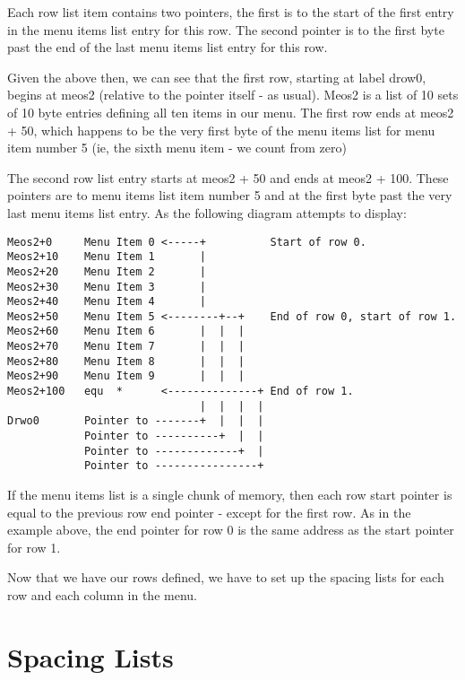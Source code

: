 Each row list item contains two pointers, the first is to the start
    of the first entry in the menu items list entry for this row. The second
    pointer is to the first byte past the end of the last menu items list
    entry for this row.

Given the above then, we can see that the first row, starting at
    label drow0, begins at meos2 (relative to the pointer itself -{} as usual).
    Meos2 is a list of 10 sets of 10 byte entries defining all ten items in
    our menu. The first row ends at meos2 + 50, which happens to be the very
    first byte of the menu items list for menu item number 5 (ie, the sixth
    menu item -{} we count from zero)

The second row list entry starts at meos2 + 50 and ends at meos2 +
    100. These pointers are to menu items list item number 5 and at the first
    byte past the very last menu items list entry. As the following diagram
    attempts to display:

\begin{lstlisting}[frame=none,numbers=none,caption={Relationship between the Row List \& Menu Items List} ]
Meos2+0     Menu Item 0 <-----+          Start of row 0.   
Meos2+10    Menu Item 1       |  
Meos2+20    Menu Item 2       |
Meos2+30    Menu Item 3       |
Meos2+40    Menu Item 4       |
Meos2+50    Menu Item 5 <--------+--+    End of row 0, start of row 1.
Meos2+60    Menu Item 6       |  |  |  
Meos2+70    Menu Item 7       |  |  |  
Meos2+80    Menu Item 8       |  |  |
Meos2+90    Menu Item 9       |  |  |
Meos2+100   equ  *      <--------------+ End of row 1.
                              |  |  |  | 
Drwo0       Pointer to -------+  |  |  |
            Pointer to ----------+  |  |
            Pointer to -------------+  |
            Pointer to ----------------+
\end{lstlisting}

If the menu items list is a single chunk of memory, then each row
    start pointer is equal to the previous row end pointer -{} except for the
    first row. As in the example above, the end pointer for row 0 is the same
    address as the start pointer for row 1.

Now that we have our rows defined, we have to set up the spacing
    lists for each row and each column in the menu.

\section{Spacing Lists}
\label{ch29-app-menu-space-lists}%

